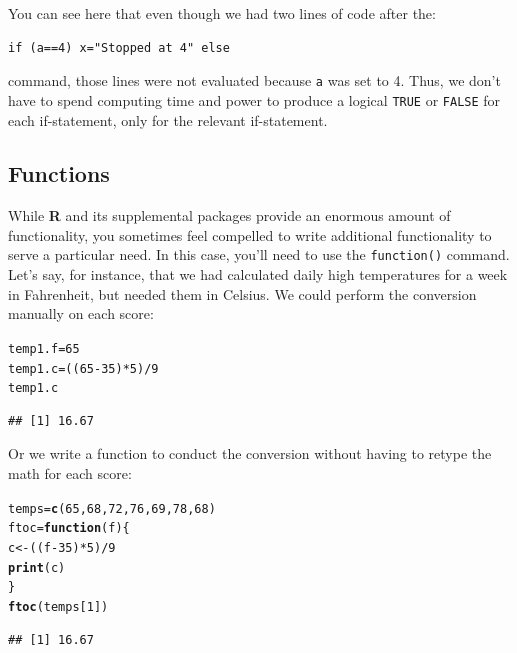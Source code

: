 \documentclass[12pt]{article}\usepackage[]{graphicx}\usepackage[]{color}
\makeatletter
\newcommand{\hlnum}[1]{\textcolor[rgb]{0.686,0.059,0.569}{#1}}%
\newcommand{\hlopt}[1]{\textcolor[rgb]{0,0,0}{#1}}%
\newcommand{\hlstd}[1]{\textcolor[rgb]{0.345,0.345,0.345}{#1}}%
\newcommand{\hlkwa}[1]{\textcolor[rgb]{0.161,0.373,0.58}{\textbf{#1}}}%
\newcommand{\hlkwb}[1]{\textcolor[rgb]{0.69,0.353,0.396}{#1}}%
\newcommand{\hlkwc}[1]{\textcolor[rgb]{0.333,0.667,0.333}{#1}}%
\newcommand{\hlkwd}[1]{\textcolor[rgb]{0.737,0.353,0.396}{\textbf{#1}}}%
\newenvironment{kframe}{%
 \def\at@end@of@kframe{}%
 \ifinner\ifhmode%
  \def\at@end@of@kframe{\end{minipage}}%
  \begin{minipage}{\columnwidth}%
 \fi\fi%
 \def\FrameCommand##1{\hskip\@totalleftmargin \hskip-\fboxsep
 \colorbox{shadecolor}{##1}\hskip-\fboxsep
     \hskip-\linewidth \hskip-\@totalleftmargin \hskip\columnwidth}%
 \MakeFramed {\advance\hsize-\width
   \@totalleftmargin\z@ \linewidth\hsize
   \@setminipage}}%
 {\par\unskip\endMakeFramed%
 \at@end@of@kframe}
\newenvironment{knitrout}{}{} %
\makeatother
\begin{document}
You can see here that even though we had two lines of code after the:
\begin{verbatim}
if (a==4) x="Stopped at 4" else
\end{verbatim}
command, those lines were not evaluated because \verb|a| was set to 4. Thus, we don't have to spend computing time and power to produce a logical \verb|TRUE| or \verb|FALSE| for each if-statement, only for the relevant if-statement.

\subsection{Functions}
While \textbf{R} and its supplemental packages provide an enormous amount of functionality, you sometimes feel compelled to write additional functionality to serve a particular need. In this case, you'll need to use the \verb|function()| command. Let's say, for instance, that we had calculated daily high temperatures for a week in Fahrenheit, but needed them in Celsius. We could perform the conversion manually on each score:
\begin{knitrout}
\color{fgcolor}\begin{kframe}
\begin{alltt}
\hlstd{temp1.f} \hlkwb{=} \hlnum{65}
\hlstd{temp1.c} \hlkwb{=} \hlstd{((}\hlnum{65} \hlopt{-} \hlnum{35}\hlstd{)} \hlopt{*} \hlnum{5}\hlstd{)}\hlopt{/}\hlnum{9}
\hlstd{temp1.c}
\end{alltt}
\begin{verbatim}
## [1] 16.67
\end{verbatim}
\end{kframe}
\end{knitrout}


Or we write a function to conduct the conversion without having to retype the math for each score:
\begin{knitrout}
\color{fgcolor}\begin{kframe}
\begin{alltt}
\hlstd{temps} \hlkwb{=} \hlkwd{c}\hlstd{(}\hlnum{65}\hlstd{,} \hlnum{68}\hlstd{,} \hlnum{72}\hlstd{,} \hlnum{76}\hlstd{,} \hlnum{69}\hlstd{,} \hlnum{78}\hlstd{,} \hlnum{68}\hlstd{)}
\hlstd{ftoc} \hlkwb{=} \hlkwa{function}\hlstd{(}\hlkwc{f}\hlstd{) \{}
    \hlstd{c} \hlkwb{<-} \hlstd{((f} \hlopt{-} \hlnum{35}\hlstd{)} \hlopt{*} \hlnum{5}\hlstd{)}\hlopt{/}\hlnum{9}
    \hlkwd{print}\hlstd{(c)}
\hlstd{\}}
\hlkwd{ftoc}\hlstd{(temps[}\hlnum{1}\hlstd{])}
\end{alltt}
\begin{verbatim}
## [1] 16.67
\end{verbatim}
\end{kframe}
\end{knitrout}
\end{document}
